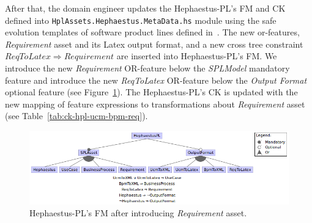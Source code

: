 After that, the domain engineer updates the Hephaestus-PL's FM and CK defined into \texttt{HplAssets.Hephaestus.MetaData.hs} module using the safe evolution templates of software product lines defined in~\cite{gpce11}. The new or-features, \textit{Requirement} asset and its Latex output format, and 
a new cross tree constraint  $ReqToLatex \Rightarrow Requirement$ are inserted into Hephaestus-PL's FM. 
We introduce the new \textit{Requirement} OR-feature below the \textit{SPLModel} mandatory feature and introduce the new \textit{ReqToLatex} OR-feature below the \textit{Output Format} optional feature (see Figure~\ref{fig:fm-hpl-ucm-bpm-req}). 
The Hephaestus-PL's CK is updated with the new mapping of feature expressions to transformations about \textit{Requirement} asset (see Table~\ref{tab:ck-hpl-ucm-bpm-req}).



\begin{figure}[bth]
\begin{center}
\includegraphics[scale=0.5]{imagens/fm-hpl-ucm-bpm-req.png}
\end{center}
\caption{Hephaestus-PL's FM after introducing \textit{Requirement} asset.}
\label{fig:fm-hpl-ucm-bpm-req}
\end{figure}

